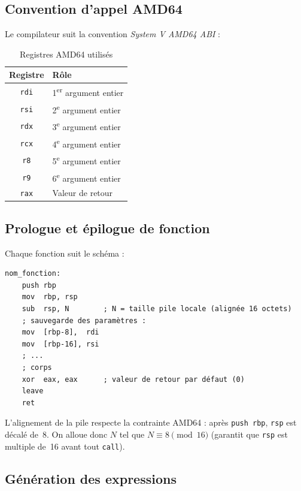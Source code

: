 \documentclass[12pt,a4paper]{article}
\begin{document}
\subsection{Convention d'appel AMD64}

Le compilateur suit la convention \textit{System V AMD64 ABI} :

\begin{table}[H]
\centering
\begin{tabular}{cl}
\toprule
\textbf{Registre} & \textbf{Rôle} \\
\midrule
\texttt{rdi} & 1\textsuperscript{er} argument entier \\
\texttt{rsi} & 2\textsuperscript{e} argument entier \\
\texttt{rdx} & 3\textsuperscript{e} argument entier \\
\texttt{rcx} & 4\textsuperscript{e} argument entier \\
\texttt{r8}  & 5\textsuperscript{e} argument entier \\
\texttt{r9}  & 6\textsuperscript{e} argument entier \\
\texttt{rax} & Valeur de retour \\
\bottomrule
\end{tabular}
\caption{Registres AMD64 utilisés}
\end{table}

\subsection{Prologue et épilogue de fonction}

Chaque fonction suit le schéma :

\begin{lstlisting}[language={[x86masm]Assembler}, caption={Prologue/épilogue standard}]
nom_fonction:
    push rbp
    mov  rbp, rsp
    sub  rsp, N        ; N = taille pile locale (alignée 16 octets)
    ; sauvegarde des paramètres :
    mov  [rbp-8],  rdi
    mov  [rbp-16], rsi
    ; ...
    ; corps
    xor  eax, eax      ; valeur de retour par défaut (0)
    leave
    ret
\end{lstlisting}

L'alignement de la pile respecte la contrainte AMD64 : après \texttt{push rbp},
\texttt{rsp} est décalé de~8. On alloue donc $N$ tel que $N \equiv 8 \pmod{16}$
(garantit que \texttt{rsp} est multiple de~16 avant tout \texttt{call}).

\subsection{Génération des expressions}
\end{document}
